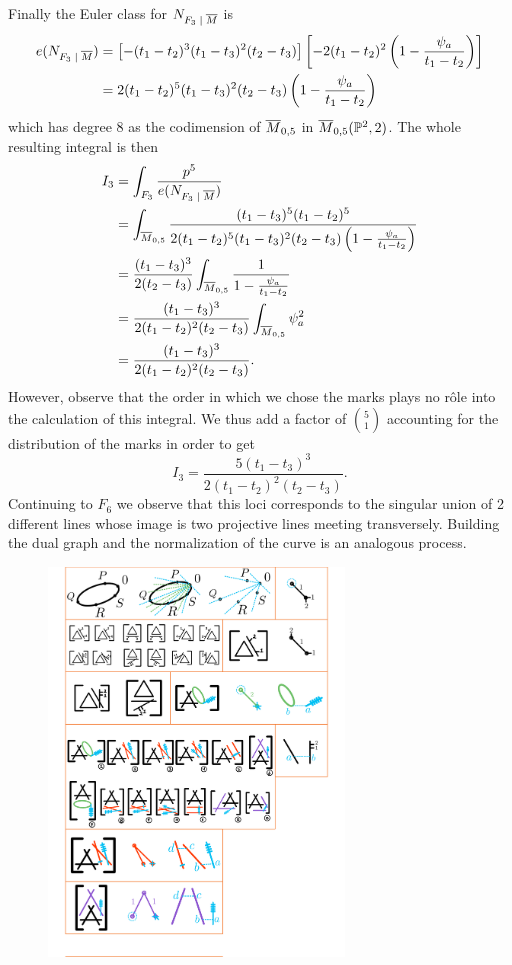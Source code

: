 \documentclass[12pt]{memoir}
\begin{document}
\begin{Ex}
\begin{itemize}
    \end{itemize}
    Finally the Euler class for $N_{F_3\mid\ov M}$ is 
    \begin{align*}
        e(N_{F_3\mid\ov M})&=\bonj{-(t_1-t_2)^3(t_1-t_3)^2(t_2-t_3)}\bonj{-2(t_1-t_2)^2\left(1-\frac{\psi_a}{t_1-t_2}\right)}\\
        &=2(t_1-t_2)^5(t_1-t_3)^2(t_2-t_3)\left(1-\frac{\psi_a}{t_1-t_2}\right)
    \end{align*}
    which has degree 8 as the codimension of $\overline M_{0,5}$ in $\overline M_{0,5}(\mathbb{P}^2,2)$. The whole resulting integral is then 
    \begin{align*}
        I_3&=\int_{F_3}\frac{p^5}{e(N_{F_3\mid\ov M})}\\
        &=\int_{\ov M_{0,5}}\frac{(t_1-t_3)^5(t_1-t_2)^5}{2(t_1-t_2)^5(t_1-t_3)^2(t_2-t_3)\left(1-\frac{\psi_a}{t_1-t_2}\right)}\\
        &=\frac{(t_1-t_3)^3}{2(t_2-t_3)}\int_{\ov M_{0,5}}\frac{1}{1-\frac{\psi_a}{t_1-t_2}}\\
        &=\frac{(t_1-t_3)^3}{2(t_1-t_2)^2(t_2-t_3)}\int_{\ov M_{0,5}}\psi_a^2\\
        &=\frac{(t_1-t_3)^3}{2(t_1-t_2)^2(t_2-t_3)}.
    \end{align*}
    However, observe that the order in which we chose the marks plays no r\^ole into the calculation of this integral. We thus add a factor of $\binom{5}{1}$ accounting for the distribution of the marks in order to get 
    $$I_3=\frac{5(t_1-t_3)^3}{2(t_1-t_2)^2(t_2-t_3)}.$$
    Continuing to $F_6$ we observe that this loci corresponds to the singular union of 2 different lines whose image is two projective lines meeting transversely. Building the dual graph and the normalization of the curve is an analogous process.
    \begin{figure}[h!]
        \centering
        \includegraphics[width=0.7\textwidth, trim= 1.32cm 1.7cm 9cm 23cm,clip]{../figs/FigsDNnotability3.pdf}

\end{figure}
\end{Ex}
\end{document}
